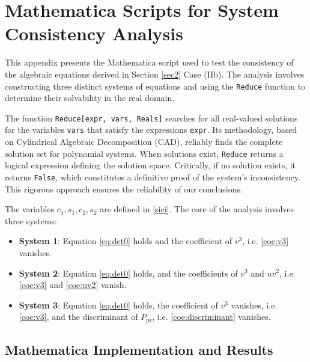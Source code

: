 \documentclass[12pt]{amsart}
\begin{document}
	
	
	
	
	
	
	
	
	\appendix
\section{Mathematica Scripts for System Consistency Analysis}\label{appendix}
\label{app:mathematica_consistency}

This appendix presents the Mathematica script \cite{Mathematica} used to test the consistency of the algebraic equations derived in Section \ref{sec2} Case (IIb). The analysis involves constructing three distinct systems of equations and using the \texttt{Reduce} function to determine their solvability in the real domain.

The function \texttt{Reduce[expr, vars, Reals]} searches for all real-valued solutions for the variables \texttt{vars} that satisfy the expressions \texttt{expr}. Its methodology, based on Cylindrical Algebraic Decomposition (CAD), reliably finds the complete solution set for polynomial systems. When solutions exist, \texttt{Reduce} returns a logical expression defining the solution space. Critically, if no solution exists, it returns \texttt{False}, which constitutes a definitive proof of the system's inconsistency. This rigorous approach ensures the reliability of our conclusions.

The variables \(c_1, s_1, c_2, s_2\) are defined in \eqref{sici}. The core of the analysis involves three systems:
\begin{itemize}
    \item \textbf{System 1}: Equation \eqref{eq:det0} holds and the coefficient of $v^3$, i.e. \eqref{coe:v3} vanishes.
    \item \textbf{System 2}: Equation \eqref{eq:det0} holds, and the coefficients of $v^3$ and $uv^2$, i.e. \eqref{coe:v3} and \eqref{coe:uv2} vanish.
    \item \textbf{System 3}: Equation \eqref{eq:det0} holds, the coefficient of $v^3$ vanishes, i.e. \eqref{coe:v3}, and the discriminant of $P_{\mathrm{pr}}$, i.e. \eqref{coe:discriminant} vanishes.
\end{itemize}

\subsection*{Mathematica Implementation and Results}
\end{document}

